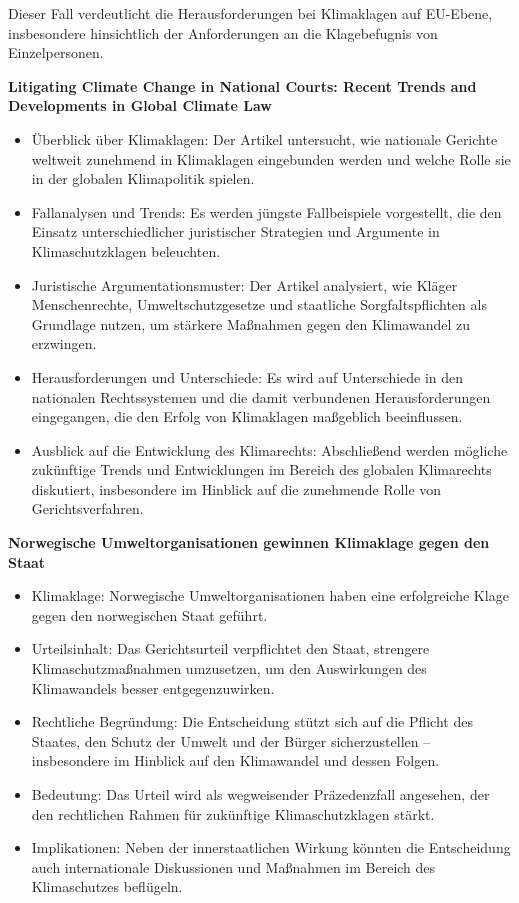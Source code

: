 \documentclass[a4paper, 12pt]{article} %
\begin{document}
 Dieser Fall verdeutlicht die Herausforderungen bei Klimaklagen auf EU-Ebene, insbesondere hinsichtlich der Anforderungen an die Klagebefugnis von Einzelpersonen.

 \textbf{\cite{bandaLitigatingClimateChange2017} Litigating {{Climate Change}} in {{National Courts}}: {{Recent Trends}} and {{Developments}} in {{Global Climate Law}}}
 \begin{itemize}
    \item Überblick über Klimaklagen: Der Artikel untersucht, wie nationale Gerichte weltweit zunehmend in Klimaklagen eingebunden werden und welche Rolle sie in der globalen Klimapolitik spielen.
    \item Fallanalysen und Trends: Es werden jüngste Fallbeispiele vorgestellt, die den Einsatz unterschiedlicher juristischer Strategien und Argumente in Klimaschutzklagen beleuchten.
    \item Juristische Argumentationsmuster:  Der Artikel analysiert, wie Kläger Menschenrechte, Umweltschutzgesetze und staatliche Sorgfaltspflichten als Grundlage nutzen, um stärkere Maßnahmen gegen den Klimawandel zu erzwingen.
    \item Herausforderungen und Unterschiede: Es wird auf Unterschiede in den nationalen Rechtssystemen und die damit verbundenen Herausforderungen eingegangen, die den Erfolg von Klimaklagen maßgeblich beeinflussen.
    \item Ausblick auf die Entwicklung des Klimarechts: Abschließend werden mögliche zukünftige Trends und Entwicklungen im Bereich des globalen Klimarechts diskutiert, insbesondere im Hinblick auf die zunehmende Rolle von Gerichtsverfahren.
 \end{itemize}

 \textbf{\cite{businessportalnorwegenNorwegischeUmweltorganisationenGewinnen2024} Norwegische Umweltorganisationen gewinnen Klimaklage gegen den Staat}
 \begin{itemize}
    \item Klimaklage: Norwegische Umweltorganisationen haben eine erfolgreiche Klage gegen den norwegischen Staat geführt.
    \item Urteilsinhalt: Das Gerichtsurteil verpflichtet den Staat, strengere Klimaschutzmaßnahmen umzusetzen, um den Auswirkungen des Klimawandels besser entgegenzuwirken.
    \item Rechtliche Begründung: Die Entscheidung stützt sich auf die Pflicht des Staates, den Schutz der Umwelt und der Bürger sicherzustellen – insbesondere im Hinblick auf den Klimawandel und dessen Folgen.
    \item Bedeutung: Das Urteil wird als wegweisender Präzedenzfall angesehen, der den rechtlichen Rahmen für zukünftige Klimaschutzklagen stärkt.
    \item Implikationen: Neben der innerstaatlichen Wirkung könnten die Entscheidung auch internationale Diskussionen und Maßnahmen im Bereich des Klimaschutzes beflügeln.
 \end{itemize}
\end{document}
